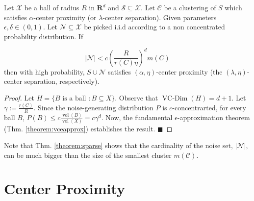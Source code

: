 \documentclass[orivec]{llncs}
\newcommand{\mc}{\mathcal}
\newcommand{\mb}{\mathbf}
\DeclareMathOperator{\vcdim}{VC-Dim}
\DeclareMathOperator{\vol}{vol}
\renewcommand{\qed}{\hfill\ensuremath{\blacksquare}}
\begin{document}
\begin{theorem}
\label{theorem:sparse}
Let $\mc X$ be a ball of radius $R$ in $\mb R^d$ and $\mc S \subseteq \mc X$. Let $\mc C$ be a clustering of $S$ which satisfies $\alpha$-center proximity (or $\lambda$-center separation). Given parameters $\epsilon, \delta \in (0,1)$. Let $\mc N \subseteq \mc X$ be picked i.i.d according to a non concentrated probability distribution. If 

\[|\mc N| < c  \left( \frac{R}{r(C) \eta} \right) ^d m(C)\]
then with high probability, $S \cup \mc N$  satisfies $(\alpha, \eta)$-center proximity (the $(\lambda, \eta)$-center separation, respectively).
\end{theorem}
\begin{proof}
Let $H = \{B \text{ is a ball }: B \subseteq X\}$. Observe that $\vcdim(H) = d+1$. Let $\gamma := \frac{r(C)}{R}$. Since the noise-generating distribution $P$ is $c$-concentrarted, for every ball $B$, $P(B) \leq c \frac{\vol(B)}{\vol(X)} = c\gamma^d$. Now, the fundamental $\epsilon$-approximation theorem (Thm. \ref{theorem:vceapprox}) establishes the result.
\qed
\end{proof}

\noindent Note that Thm. \ref{theorem:sparse} shows that the cardinality of the noise set, $|\mc N|$, can be much bigger than the size of the smallest cluster $m(\mc C)$. 

\section{Center Proximity}
\label{section:cp}
\end{document}
